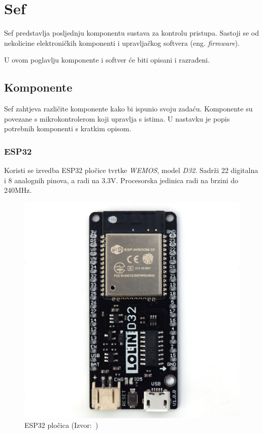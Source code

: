 \chapter{Sef}

Sef predstavlja posljednju komponentu sustava za kontrolu pristupa.
Sastoji se od nekolicine elektroničkih komponenti i upravljačkog softvera (eng. \textit{firmware}).

U ovom poglavlju komponente i softver će biti opisani i razrađeni.

\section{Komponente}

Sef zahtjeva različite komponente kako bi ispunio svoju zadaću.
Komponente su povezane s mikrokontrolerom koji upravlja s istima.
U nastavku je popis potrebnih komponenti s kratkim opisom.

\subsection{ESP32}

Koristi se izvedba ESP32 pločice tvrtke \textit{WEMOS}, model \textit{D32}.
Sadrži 22 digitalna i 8 analognih pinova, a radi na 3.3V\@.
Procesorska jedinica radi na brzini do 240MHz.

\begin{figure}[h!]
    \centering
    \includegraphics[scale=0.5]{images/d32_lolin}
    \caption{ESP32 pločica (Izvor:~\cite{wemos-docs})}
\end{figure}

